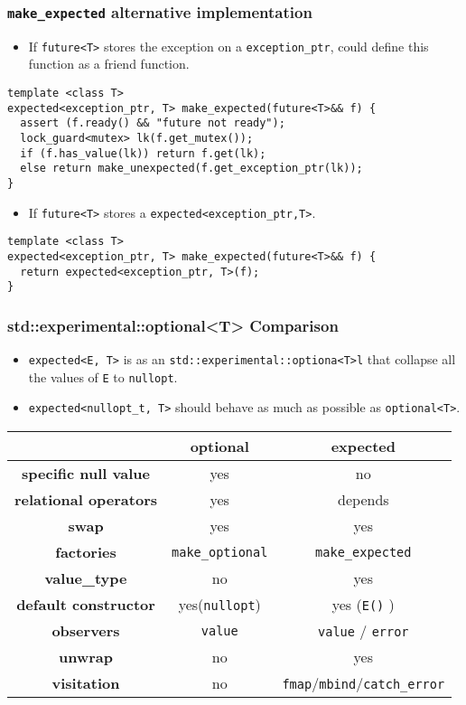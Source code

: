\documentclass[xcolor=dvipsnames]{beamer}
\newcommand{\cpp}[1]{\lstinline{#1}}
\begin{document}
\begin{frame}[fragile]
\frametitle{\cpp{make_expected} alternative implementation }

\begin{itemize}
\item If  \cpp{future<T>} stores the exception on a  \cpp{exception_ptr}, could define this function as a friend function.   
\end{itemize}

\begin{lstlisting}
template <class T>
expected<exception_ptr, T> make_expected(future<T>&& f) {
  assert (f.ready() && "future not ready");
  lock_guard<mutex> lk(f.get_mutex());
  if (f.has_value(lk)) return f.get(lk);
  else return make_unexpected(f.get_exception_ptr(lk));
}
\end{lstlisting}

\begin{itemize}
\item If \cpp{future<T>} stores a \cpp{expected<exception_ptr,T>}.
\end{itemize}

\begin{lstlisting}
template <class T>
expected<exception_ptr, T> make_expected(future<T>&& f) {
  return expected<exception_ptr, T>(f);
}
\end{lstlisting}

\end{frame}
\begin{frame}[fragile]
\frametitle{std::experimental::optional<T> Comparison}

\begin{itemize}
  \item \cpp{expected<E, T>} is as an \cpp{std::experimental::optiona<T>l} that collapse all the values of \cpp{E} to \cpp{nullopt}.
  \item \cpp{expected<nullopt_t, T>} should behave as much as possible as \cpp{optional<T>}.
\end{itemize}
  
\begin{tabular}{|c|c|c|}
\hline
                    & \textbf{optional} & \textbf{expected}  \\
\hline
\textbf{specific null value} & yes & no \\
\hline
\textbf{relational operators} & yes & depends \\
\hline
\textbf{swap} & yes & yes \\
\hline
\textbf{factories} & \cpp{make_optional} & \cpp{make_expected}  \\
\hline
\textbf{value\_type} & no & yes  \\
\hline
\textbf{default constructor} & yes(\cpp{nullopt})  & yes (\cpp{E()} )  \\
\hline
\textbf{observers} & \cpp{value}  & \cpp{value} / \cpp{error}   \\
\hline
\textbf{unwrap} & no  & yes   \\
\hline
\textbf{visitation} & no & \cpp{fmap}/\cpp{mbind}/\cpp{catch_error}  \\
\hline
\end{tabular}
\end{frame}
\end{document}
